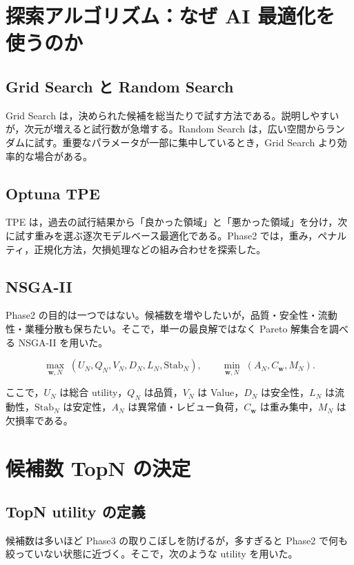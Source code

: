 \documentclass[a4paper,10pt]{article}
\newcommand{\1}{\mathbf{1}}
\begin{document}
\section{探索アルゴリズム：なぜ AI 最適化を使うのか}

\subsection{Grid Search と Random Search}
Grid Search は，決められた候補を総当たりで試す方法である。説明しやすいが，次元が増えると試行数が急増する。Random Search は，広い空間からランダムに試す。重要なパラメータが一部に集中しているとき，Grid Search より効率的な場合がある。

\subsection{Optuna TPE}
TPE は，過去の試行結果から「良かった領域」と「悪かった領域」を分け，次に試す重みを選ぶ逐次モデルベース最適化である。Phase2 では，重み，ペナルティ，正規化方法，欠損処理などの組み合わせを探索した。

\subsection{NSGA-II}
Phase2 の目的は一つではない。候補数を増やしたいが，品質・安全性・流動性・業種分散も保ちたい。そこで，単一の最良解ではなく Pareto 解集合を調べる NSGA-II を用いた。

\begin{equation}
\max_{\bm w,N}\; \left( U_N, Q_N, V_N, D_N, L_N, \mathrm{Stab}_N \right), \qquad \min_{\bm w,N}\; \left( A_N, C_{\bm w}, M_N \right).
\label{eq:multiobjective}
\end{equation}

ここで，$U_N$ は総合 utility，$Q_N$ は品質，$V_N$ は Value，$D_N$ は安全性，$L_N$ は流動性，$\mathrm{Stab}_N$ は安定性，$A_N$ は異常値・レビュー負荷，$C_{\bm w}$ は重み集中，$M_N$ は欠損率である。

\section{候補数 TopN の決定}

\subsection{TopN utility の定義}
候補数は多いほど Phase3 の取りこぼしを防げるが，多すぎると Phase2 で何も絞っていない状態に近づく。そこで，次のような utility を用いた。
\end{document}
